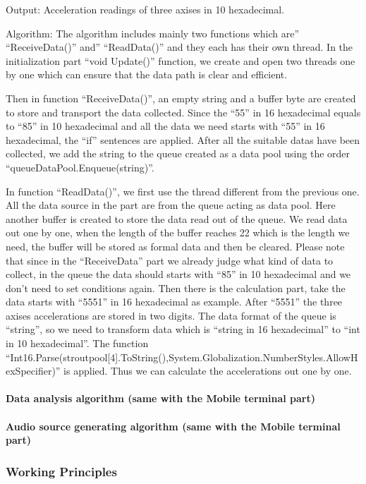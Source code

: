  Output: Acceleration readings of three axises in 10 hexadecimal. 

 Algorithm: The algorithm includes mainly two functions which are''
 ``ReceiveData()'' and'' ``ReadData()'' and they each has their own thread. In
 the initialization part “void Update()” function, we create and open two
 threads one by one which can ensure that the data path is clear and efficient.

 Then in function ``ReceiveData()'', an empty string and a buffer byte are
 created to store and transport the data collected. Since the “55” in 16
 hexadecimal equals to “85” in 10 hexadecimal and all the data we need starts
 with “55” in 16 hexadecimal, the “if” sentences are applied. After all the
 suitable datas have been collected, we add the string to the queue created as a
 data pool using the order “queueDataPool.Enqueue(string)”. 

 In function ``ReadData()'', we first use the thread different from the previous
 one. All the data source in the part are from the queue acting as data pool.
 Here another buffer is created to store the data read out of the queue. We read
 data out one by one, when the length of the buffer reaches 22 which is the
 length we need, the buffer will be stored as formal data and then be cleared.
 Please note that since in the “ReceiveData” part we already judge what kind of
 data to collect, in the queue the data should starts with “85” in 10
 hexadecimal and we don’t need to set conditions again. Then there is the
 calculation part, take the data starts with “5551” in 16 hexadecimal as
 example. After “5551” the three axises accelerations are stored in two digits.
 The data format of the queue is “string”, so we need to transform data which is
 “string in 16 hexadecimal” to “int in 10 hexadecimal”. The function
 “Int16.Parse(stroutpool[4].ToString(),System.Globalization.NumberStyles.AllowHexSpecifier)” 
 is applied. Thus we can calculate the accelerations out one by one.  
\paragraph{Data analysis algorithm (same with the Mobile terminal part)}
\paragraph{Audio source generating algorithm (same with the Mobile terminal
  part)} 
\subsubsection{Working Principles}